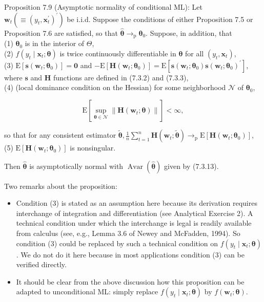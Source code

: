 \documentclass[10pt]{article}
\begin{document}
Proposition 7.9 (Asymptotic normality of conditional ML): Let $\mathbf{w}_{t}\left(\equiv\left(y_{t}, \mathbf{x}_{t}^{\prime}\right)^{\prime}\right)$ be i.i.d. Suppose the conditions of either Proposition 7.5 or Proposition 7.6 are satisfied, so that $\hat{\boldsymbol{\theta}} \rightarrow_{\mathrm{p}} \boldsymbol{\theta}_{0}$. Suppose, in addition, that\\
(1) $\boldsymbol{\theta}_{0}$ is in the interior of $\Theta$,\\
(2) $f\left(y_{t} \mid \mathbf{x}_{t} ; \boldsymbol{\theta}\right)$ is twice continuously differentiable in $\boldsymbol{\theta}$ for all $\left(y_{t}, \mathbf{x}_{t}\right)$,\\
(3) $\mathrm{E}\left[\mathbf{s}\left(\mathbf{w}_{t} ; \boldsymbol{\theta}_{0}\right)\right]=\mathbf{0}$ and $-\mathrm{E}\left[\mathbf{H}\left(\mathbf{w}_{t} ; \boldsymbol{\theta}_{0}\right)\right]=\mathrm{E}\left[\mathbf{s}\left(\mathbf{w}_{t} ; \boldsymbol{\theta}_{0}\right) \mathbf{s}\left(\mathbf{w}_{t} ; \boldsymbol{\theta}_{0}\right)^{\prime}\right]$, where $\mathbf{s}$ and $\mathbf{H}$ functions are defined in (7.3.2) and (7.3.3),\\
(4) (local dominance condition on the Hessian) for some neighborhood $\mathcal{N}$ of $\boldsymbol{\theta}_{0}$,

$$
\mathrm{E}\left[\sup _{\boldsymbol{\theta} \in \mathcal{N}}\left\|\mathbf{H}\left(\mathbf{w}_{t} ; \boldsymbol{\theta}\right)\right\|\right]<\infty,
$$

so that for any consistent estimator $\tilde{\boldsymbol{\theta}}, \frac{1}{n} \sum_{t=1}^{n} \mathbf{H}\left(\mathbf{w}_{t} ; \tilde{\boldsymbol{\theta}}\right) \rightarrow_{\mathrm{p}} \mathrm{E}\left[\mathbf{H}\left(\mathbf{w}_{t} ; \boldsymbol{\theta}_{0}\right)\right]$,\\
(5) $\mathrm{E}\left[\mathbf{H}\left(\mathbf{w}_{t} ; \boldsymbol{\theta}_{0}\right)\right]$ is nonsingular.

Then $\hat{\boldsymbol{\theta}}$ is asymptotically normal with $\operatorname{Avar}(\hat{\boldsymbol{\theta}})$ given by (7.3.13).

Two remarks about the proposition:

\begin{itemize}
  \item Condition (3) is stated as an assumption here because its derivation requires interchange of integration and differentiation (see Analytical Exercise 2). A technical condition under which the interchange is legal is readily available from calculus (see, e.g., Lemma 3.6 of Newey and McFadden, 1994). So condition (3) could be replaced by such a technical condition on $f\left(y_{t} \mid \mathbf{x}_{t} ; \boldsymbol{\theta}\right)$. We do not do it here because in most applications condition (3) can be verified directly.
  \item It should be clear from the above discussion how this proposition can be adapted to unconditional ML: simply replace $f\left(y_{t} \mid \mathbf{x}_{t} ; \boldsymbol{\theta}\right)$ by $f\left(\mathbf{w}_{t} ; \boldsymbol{\theta}\right)$.
\end{itemize}
\end{document}
